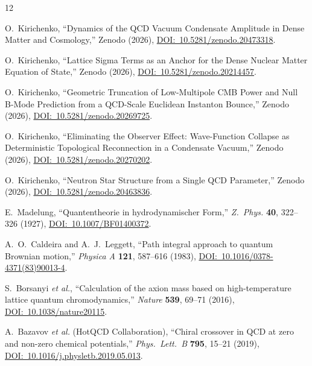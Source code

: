 \documentclass[12pt,a4paper]{article}
\theoremstyle{plain}
\theoremstyle{definition}
\theoremstyle{remark}
\begin{document}
\begin{thebibliography}{12}

O.~Kirichenko,
``Dynamics of the QCD Vacuum Condensate Amplitude in Dense
  Matter and Cosmology,''
Zenodo (2026),
\href{https://doi.org/10.5281/zenodo.20473318}%
     {DOI:~10.5281/zenodo.20473318}.

O.~Kirichenko,
``Lattice Sigma Terms as an Anchor for the Dense Nuclear
  Matter Equation of State,''
Zenodo (2026),
\href{https://doi.org/10.5281/zenodo.20214457}%
     {DOI:~10.5281/zenodo.20214457}.

O.~Kirichenko,
``Geometric Truncation of Low-Multipole CMB Power and
  Null B-Mode Prediction from a QCD-Scale Euclidean
  Instanton Bounce,''
Zenodo (2026),
\href{https://doi.org/10.5281/zenodo.20269725}%
     {DOI:~10.5281/zenodo.20269725}.

O.~Kirichenko,
``Eliminating the Observer Effect: Wave-Function Collapse as
  Deterministic Topological Reconnection in a Condensate
  Vacuum,''
Zenodo (2026),
\href{https://doi.org/10.5281/zenodo.20270202}%
     {DOI:~10.5281/zenodo.20270202}.

O.~Kirichenko,
``Neutron Star Structure from a Single QCD Parameter,''
Zenodo (2026),
\href{https://doi.org/10.5281/zenodo.20463836}%
     {DOI:~10.5281/zenodo.20463836}.

E.~Madelung,
``Quantentheorie in hydrodynamischer Form,''
\emph{Z.\ Phys.} \textbf{40}, 322--326 (1927),
\href{https://doi.org/10.1007/BF01400372}%
     {DOI:~10.1007/BF01400372}.

A.~O.~Caldeira and A.~J.~Leggett,
``Path integral approach to quantum Brownian motion,''
\emph{Physica A} \textbf{121}, 587--616 (1983),
\href{https://doi.org/10.1016/0378-4371(83)90013-4}%
     {DOI:~10.1016/0378-4371(83)90013-4}.

S.~Borsanyi \emph{et al.},
``Calculation of the axion mass based on high-temperature
  lattice quantum chromodynamics,''
\emph{Nature} \textbf{539}, 69--71 (2016),
\href{https://doi.org/10.1038/nature20115}%
     {DOI:~10.1038/nature20115}.

A.~Bazavov \emph{et al.} (HotQCD Collaboration),
``Chiral crossover in QCD at zero and non-zero chemical
  potentials,''
\emph{Phys.\ Lett.\ B} \textbf{795}, 15--21 (2019),
\href{https://doi.org/10.1016/j.physletb.2019.05.013}%
     {DOI:~10.1016/j.physletb.2019.05.013}.


\end{thebibliography}
\end{document}
